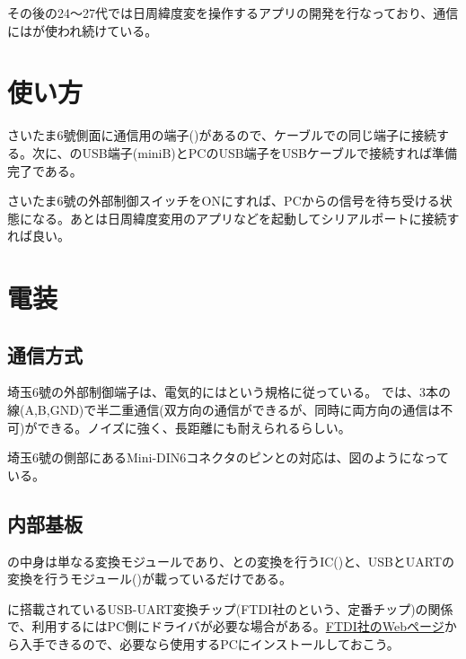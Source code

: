 \documentclass[letterpaper,10pt,dvipdfmx]{sphinxmanual}
\begin{document}
その後の24〜27代では日周緯度変を操作するアプリの開発を行なっており、通信にはが使われ続けている。


\section{使い方}
\label{\detokenize{nissyu-idohen/ikebukuro:}}\label{\detokenize{nissyu-idohen/ikebukuro:id3}}
さいたま6號側面に通信用の端子()があるので、ケーブルでの同じ端子に接続する。次に、のUSB端子(miniB)とPCのUSB端子をUSBケーブルで接続すれば準備完了である。

さいたま6號の外部制御スイッチをONにすれば、PCからの信号を待ち受ける状態になる。あとは日周緯度変用のアプリなどを起動してシリアルポートに接続すれば良い。


\section{電装}
\label{\detokenize{nissyu-idohen/ikebukuro:}}\label{\detokenize{nissyu-idohen/ikebukuro:id4}}

\subsection{通信方式}
\label{\detokenize{nissyu-idohen/ikebukuro:}}\label{\detokenize{nissyu-idohen/ikebukuro:id5}}
埼玉6號の外部制御端子は、電気的にはという規格に従っている。
では、3本の線(A,B,GND)で半二重通信(双方向の通信ができるが、同時に両方向の通信は不可)ができる。ノイズに強く、長距離にも耐えられるらしい。

埼玉6號の側部にあるMini-DIN6コネクタのピンとの対応は、図のようになっている。



\subsection{内部基板}
\label{\detokenize{nissyu-idohen/ikebukuro:}}\label{\detokenize{nissyu-idohen/ikebukuro:id6}}
の中身は単なる変換モジュールであり、との変換を行うIC()と、USBとUARTの変換を行うモジュール()が載っているだけである。

に搭載されているUSB-UART変換チップ(FTDI社のという、定番チップ)の関係で、利用するにはPC側にドライバが必要な場合がある。\href{http://www.ftdichip.com/Drivers/VCP.htm}{FTDI社のWebページ}から入手できるので、必要なら使用するPCにインストールしておこう。
\end{document}
